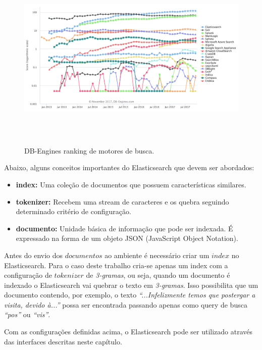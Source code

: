 \documentclass[12pt,a4paper]{article}
\begin{document}
\begin{figure}[H]
	\centering
  \includegraphics[height=9cm]{images/figure_12.png}
  \caption{DB-Engines ranking de motores de busca. \cite{db-engines}}
  \label{fig-search-ranking}
\end{figure}

Abaixo, alguns conceitos importantes do Elasticsearch que devem ser abordados:

 \begin{itemize}
   \item \textbf{index:} Uma coleção de documentos que possuem características similares.
   \item \textbf{tokenizer:} Recebem uma stream de caracteres e os quebra seguindo determinado critério de configuração.
   \item \textbf{documento:} Unidade básica de informação que pode ser indexada. É expressado na forma de um objeto JSON (JavaScript Object Notation).
 \end{itemize}

Antes do envio dos $documentos$ ao ambiente é necessário criar um $index$ no Elasticsearch. Para o caso deste trabalho cria-se apenas um index com a configuração
de $tokenizer$ de \textit{3-gramas}, ou seja, quando um documento é indexado o Elasticsearch vai quebrar o texto em \textit{3-gramas}. Isso
possibilita que um documento contendo, por exemplo, o texto \textit{``...Infelizmente temos que postergar a visita, devido à...''} possa ser encontrada passando
apenas como query de busca \textit{``pos''} ou \textit{``vis''}.

Com as configurações definidas acima, o Elasticsearch pode ser utilizado através das interfaces descritas neste capítulo.
\end{document}
